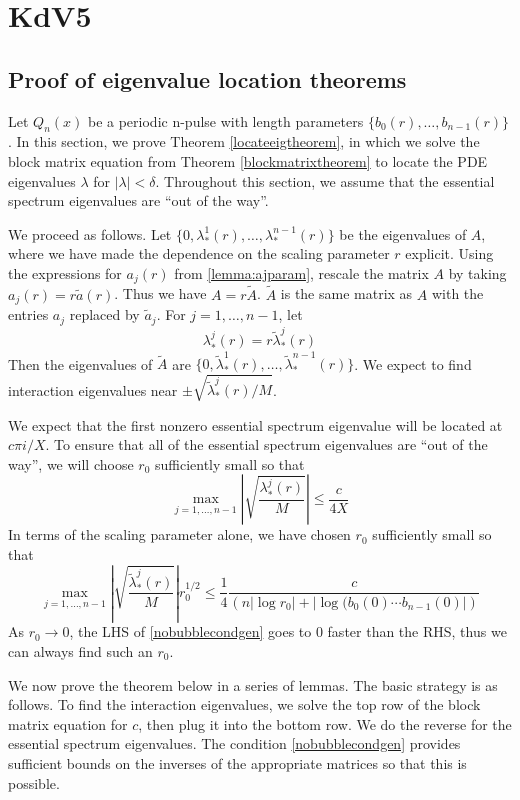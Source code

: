 \documentclass[thesis.tex]{subfiles}
\begin{document}
\iffulldocument\else
	\chapter{KdV5}
\fi

\section{Proof of eigenvalue location theorems}

Let $Q_n(x)$ be a periodic n-pulse with length parameters $\{ b_0(r), \dots, b_{n-1}(r)\}$. In this section, we prove Theorem \ref{locateeigtheorem}, in which we solve the block matrix equation from Theorem \ref{blockmatrixtheorem} to locate the PDE eigenvalues $\lambda$ for $|\lambda| < \delta$. Throughout this section, we assume that the essential spectrum eigenvalues are ``out of the way''. 

We proceed as follows. Let $\{ 0, \lambda_*^1(r), \dots, \lambda_*^{n-1}(r) \}$ be the eigenvalues of $A$, where we have made the dependence on the scaling parameter $r$ explicit. Using the expressions for $a_j(r)$ from \cref{lemma:ajparam}, rescale the matrix $A$ by taking $a_j(r) = r \tilde{a}(r)$. Thus we have $A = r \tilde{A}$. $\tilde{A}$ is the same matrix as $A$ with the entries $a_j$ replaced by $\tilde{a}_j$. For $j = 1,\dots, n-1$, let 
\[
\lambda_*^j(r) = r \tilde{\lambda}_*^j(r)
\] 
Then the eigenvalues of $\tilde{A}$ are $\{ 0, \tilde{\lambda}_*^1(r), \dots, \tilde{\lambda}_*^{n-1}(r) \}$. We expect to find interaction eigenvalues near $\pm \sqrt{\tilde{\lambda}_*^j(r)/M}$.

We expect that the first nonzero essential spectrum eigenvalue will be located at $c \pi i/X$. To ensure that all of the essential spectrum eigenvalues are ``out of the way'', we will choose $r_0$ sufficiently small so that
\[
\max_{j = 1, \dots, n-1}
\left| \sqrt{\frac{\lambda_*^j(r)}{M}} \right| \leq \frac{c}{4 X}
\]
In terms of the scaling parameter alone, we have chosen $r_0$ sufficiently small so that
\begin{equation}\label{nobubblecondgen}
\max_{j = 1, \dots, n-1} \left| \sqrt{\frac{\tilde{\lambda}_*^j(r)}{M}}\right|r_0^{1/2} \leq \frac{1}{4} \frac{c}{\left( n |\log r_0| + |\log( b_0(0) \cdots b_{n-1}(0) |\right)}
\end{equation}
As $r_0 \rightarrow 0$, the LHS of \cref{nobubblecondgen} goes to 0 faster than the RHS, thus we can always find such an $r_0$.

We now prove the theorem below in a series of lemmas. The basic strategy is as follows. To find the interaction eigenvalues, we solve the top row of the block matrix equation for $c$, then plug it into the bottom row. We do the reverse for the essential spectrum eigenvalues. The condition \cref{nobubblecondgen} provides sufficient bounds on the inverses of the appropriate matrices so that this is possible.
\end{document}
